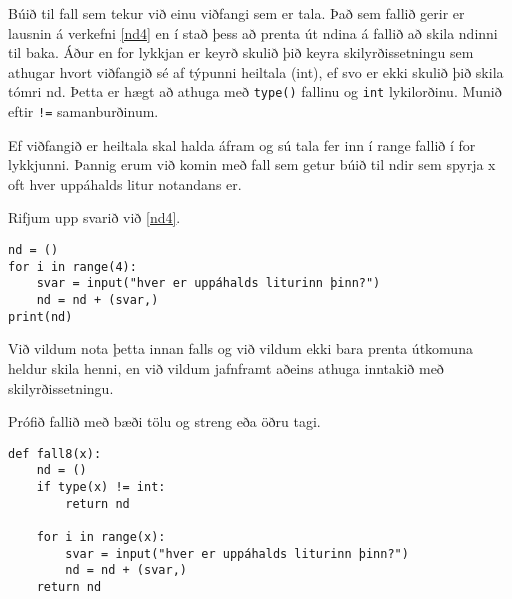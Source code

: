 \begin{exercise}\label{fun8}
Búið til fall sem tekur við einu viðfangi sem er tala.
Það sem fallið gerir er lausnin á verkefni \ref{nd4} en í stað þess að prenta út ndina á fallið að skila ndinni til baka.
Áður en for lykkjan er keyrð skulið þið keyra skilyrðissetningu sem athugar hvort viðfangið sé af týpunni heiltala (int), ef svo er ekki skulið þið skila tómri nd.
Þetta er hægt að athuga með \texttt{type()} fallinu og \texttt{int} lykilorðinu.
Munið eftir \texttt{!=} samanburðinum.

Ef viðfangið er heiltala skal halda áfram og sú tala fer inn í range fallið í for lykkjunni.
Þannig erum við komin með fall sem getur búið til ndir sem spyrja x oft hver uppáhalds litur notandans er.
\end{exercise}
\begin{Answer}[ref={fun8}]
Rifjum upp svarið við \ref{nd4}.
\begin{lstlisting}
nd = ()
for i in range(4):
	svar = input("hver er uppáhalds liturinn þinn?")
	nd = nd + (svar,)
print(nd)\end{lstlisting}

Við vildum nota þetta innan falls og við vildum ekki bara prenta útkomuna heldur skila henni, en við vildum jafnframt aðeins athuga inntakið með skilyrðissetningu.

Prófið fallið með bæði tölu og streng eða öðru tagi.

\begin{lstlisting}
def fall8(x):
	nd = ()
	if type(x) != int:
		return nd

	for i in range(x):
		svar = input("hver er uppáhalds liturinn þinn?")
		nd = nd + (svar,)
	return nd\end{lstlisting}
\end{Answer}

